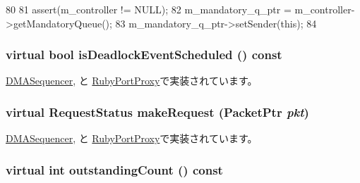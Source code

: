 \begin{DoxyCode}
80 {
81     assert(m_controller != NULL);
82     m_mandatory_q_ptr = m_controller->getMandatoryQueue();
83     m_mandatory_q_ptr->setSender(this);
84 }
\end{DoxyCode}
\hypertarget{classRubyPort_a24d37c70faaaf126b544c2d46ea70ce2}{
\subsubsection[{isDeadlockEventScheduled}]{\setlength{\rightskip}{0pt plus 5cm}virtual bool isDeadlockEventScheduled () const}}
\label{classRubyPort_a24d37c70faaaf126b544c2d46ea70ce2}


\hyperlink{classDMASequencer_a11ce018fbd3aa89624b06dbdafbd4ef9}{DMASequencer}, と \hyperlink{classRubyPortProxy_a11ce018fbd3aa89624b06dbdafbd4ef9}{RubyPortProxy}で実装されています。\hypertarget{classRubyPort_a596adbddbc1059f06e3989f743f2ed3e}{
\subsubsection[{makeRequest}]{\setlength{\rightskip}{0pt plus 5cm}virtual RequestStatus makeRequest ({\bf PacketPtr} {\em pkt})}}
\label{classRubyPort_a596adbddbc1059f06e3989f743f2ed3e}


\hyperlink{classDMASequencer_a23de6e3fbb2362f4410d435e3600d0f7}{DMASequencer}, と \hyperlink{classRubyPortProxy_a23de6e3fbb2362f4410d435e3600d0f7}{RubyPortProxy}で実装されています。\hypertarget{classRubyPort_a366b0b3d8b8a08b7066f1b98c1b40b85}{
\subsubsection[{outstandingCount}]{\setlength{\rightskip}{0pt plus 5cm}virtual int outstandingCount () const}}
\label{classRubyPort_a366b0b3d8b8a08b7066f1b98c1b40b85}


